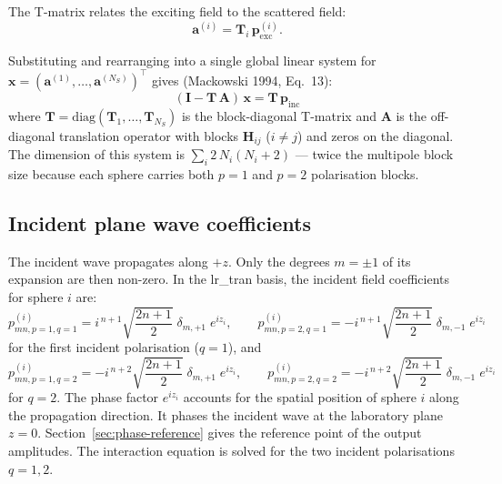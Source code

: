 \documentclass[11pt,a4paper]{article}
\begin{document}
The T-matrix relates the exciting field to the scattered field:
\begin{equation}
  \bm{a}^{(i)} = \mathbf{T}_i\,\bm{p}_\mathrm{exc}^{(i)}.
  \label{eq:tmatrix-relation}
\end{equation}

Substituting and rearranging into a single global linear system for $\bm{x} = (\bm{a}^{(1)}, \dots, \bm{a}^{(N_S)})^\top$ gives (Mackowski 1994, Eq.~13):
\begin{equation}
  (\mathbf{I} - \mathbf{T}\,\mathbf{A})\,\bm{x} = \mathbf{T}\,\bm{p}_\mathrm{inc}
  \label{eq:global-system}
\end{equation}
where $\mathbf{T} = \mathrm{diag}(\mathbf{T}_1, \dots, \mathbf{T}_{N_S})$ is the block-diagonal T-matrix and $\mathbf{A}$ is the off-diagonal translation operator with blocks $\mathbf{H}_{ij}$ ($i \neq j$) and zeros on the diagonal.
The dimension of this system is $\sum_i 2\,N_i(N_i+2)$ --- twice the multipole block size because each sphere carries both $p = 1$ and $p = 2$ polarisation blocks.

\subsection{Incident plane wave coefficients}
\label{sec:incident}

The incident wave propagates along $+z$.
Only the degrees $m = \pm 1$ of its expansion are then non-zero.
In the lr\_tran basis, the incident field coefficients for sphere $i$ are:
\begin{equation}
  p_{mn,p=1,q=1}^{(i)} = i^{\,n+1}\sqrt{\frac{2n+1}{2}}\;\delta_{m,+1}\;e^{iz_i}, \qquad
  p_{mn,p=2,q=1}^{(i)} = -i^{\,n+1}\sqrt{\frac{2n+1}{2}}\;\delta_{m,-1}\;e^{iz_i}
  \label{eq:pinc-q1}
\end{equation}
for the first incident polarisation ($q = 1$), and
\begin{equation}
  p_{mn,p=1,q=2}^{(i)} = -i^{\,n+2}\sqrt{\frac{2n+1}{2}}\;\delta_{m,+1}\;e^{iz_i}, \qquad
  p_{mn,p=2,q=2}^{(i)} = -i^{\,n+2}\sqrt{\frac{2n+1}{2}}\;\delta_{m,-1}\;e^{iz_i}
  \label{eq:pinc-q2}
\end{equation}
for $q = 2$.
The phase factor $e^{iz_i}$ accounts for the spatial position of sphere $i$ along the propagation direction.
It phases the incident wave at the laboratory plane $z = 0$.
Section~\ref{sec:phase-reference} gives the reference point of the output amplitudes.
The interaction equation is solved for the two incident polarisations $q = 1, 2$.
\end{document}
